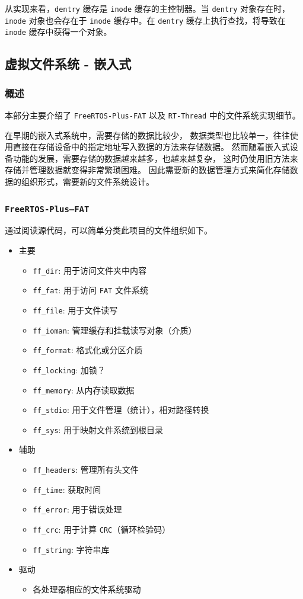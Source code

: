 \documentclass[UTF8,a4paper]{ctexart}
\begin{document}
从实现来看，\texttt{dentry} 缓存是 \texttt{inode} 缓存的主控制器。当
\texttt{dentry} 对象存在时，\texttt{inode} 对象也会存在于 \texttt{inode}
缓存中。在 \texttt{dentry} 缓存上执行查找，将导致在 \texttt{inode}
缓存中获得一个对象。

\subsection{虚拟文件系统 - 嵌入式}
\subsubsection{概述}
本部分主要介绍了 \texttt{FreeRTOS-Plus-FAT} 以及 \texttt{RT-Thread} 
中的文件系统实现细节。

在早期的嵌入式系统中，需要存储的数据比较少，
数据类型也比较单一，往往使用直接在存储设备中的指定地址写入数据的方法来存储数据。
然而随着嵌入式设备功能的发展，需要存储的数据越来越多，也越来越复杂，
这时仍使用旧方法来存储并管理数据就变得非常繁琐困难。
因此需要新的数据管理方式来简化存储数据的组织形式，需要新的文件系统设计。

\subsubsection{\texttt{FreeRTOS-Plus—FAT}}
通过阅读源代码，可以简单分类此项目的文件组织如下。
\begin{itemize}
\item 主要
\begin{itemize}
    \item \texttt{ff\_dir}: 用于访问文件夹中内容
    \item \texttt{ff\_fat}: 用于访问 \texttt{FAT} 文件系统
    \item \texttt{ff\_file}: 用于文件读写
    \item \texttt{ff\_ioman}: 管理缓存和挂载读写对象（介质）
    \item \texttt{ff\_format}: 格式化或分区介质
    \item \texttt{ff\_locking}: 加锁？
    \item \texttt{ff\_memory}: 从内存读取数据
    \item \texttt{ff\_stdio}: 用于文件管理（统计），相对路径转换
    \item \texttt{ff\_sys}: 用于映射文件系统到根目录
\end{itemize}
\item 辅助
\begin{itemize}
    \item \texttt{ff\_headers}: 管理所有头文件
    \item \texttt{ff\_time}: 获取时间
    \item \texttt{ff\_error}:  用于错误处理
    \item \texttt{ff\_crc}: 用于计算 \texttt{CRC}（循环检验码）
    \item \texttt{ff\_string}: 字符串库
\end{itemize}
\item 驱动
\begin{itemize}
    \item 各处理器相应的文件系统驱动
\end{itemize}
\end{itemize}
\end{document}
